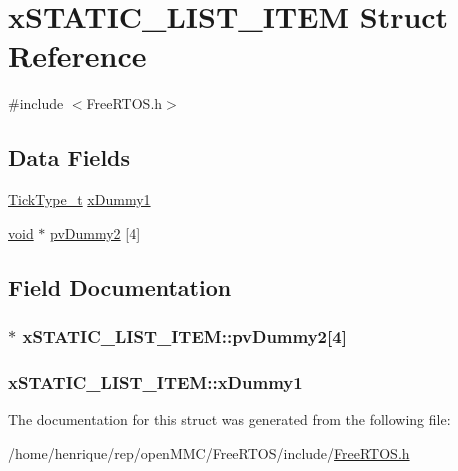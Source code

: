 \hypertarget{structxSTATIC__LIST__ITEM}{\section{x\-S\-T\-A\-T\-I\-C\-\_\-\-L\-I\-S\-T\-\_\-\-I\-T\-E\-M Struct Reference}
\label{structxSTATIC__LIST__ITEM}
}


{\ttfamily \#include $<$Free\-R\-T\-O\-S.\-h$>$}

\subsection*{Data Fields}
\begin{DoxyCompactItemize}
\item 
\hyperlink{Flsh186_2prtmacro_8h_aa69c48c6e902ce54f70886e6573c92a9}{Tick\-Type\-\_\-t} \hyperlink{structxSTATIC__LIST__ITEM_abdb8e415f1bcfbba19fbf57d8d4e9438}{x\-Dummy1}
\item 
\hyperlink{Paradigm_2Tern__EE_2small_2portmacro_8h_a14d32f8130d3c0b212cfc751730b5b49}{void} $\ast$ \hyperlink{structxSTATIC__LIST__ITEM_a53c6cb2b8094f991254635d04c9be55b}{pv\-Dummy2} \mbox{[}4\mbox{]}
\end{DoxyCompactItemize}


\subsection{Field Documentation}
\hypertarget{structxSTATIC__LIST__ITEM_a53c6cb2b8094f991254635d04c9be55b}{
\subsubsection[{pv\-Dummy2}]{$\ast$ x\-S\-T\-A\-T\-I\-C\-\_\-\-L\-I\-S\-T\-\_\-\-I\-T\-E\-M\-::pv\-Dummy2\mbox{[}4\mbox{]}}}\label{structxSTATIC__LIST__ITEM_a53c6cb2b8094f991254635d04c9be55b}
\hypertarget{structxSTATIC__LIST__ITEM_abdb8e415f1bcfbba19fbf57d8d4e9438}{
\subsubsection[{x\-Dummy1}]{ x\-S\-T\-A\-T\-I\-C\-\_\-\-L\-I\-S\-T\-\_\-\-I\-T\-E\-M\-::x\-Dummy1}}\label{structxSTATIC__LIST__ITEM_abdb8e415f1bcfbba19fbf57d8d4e9438}


The documentation for this struct was generated from the following file\-:\begin{DoxyCompactItemize}
\item 
/home/henrique/rep/open\-M\-M\-C/\-Free\-R\-T\-O\-S/include/\hyperlink{FreeRTOS_8h}{Free\-R\-T\-O\-S.\-h}\end{DoxyCompactItemize}
